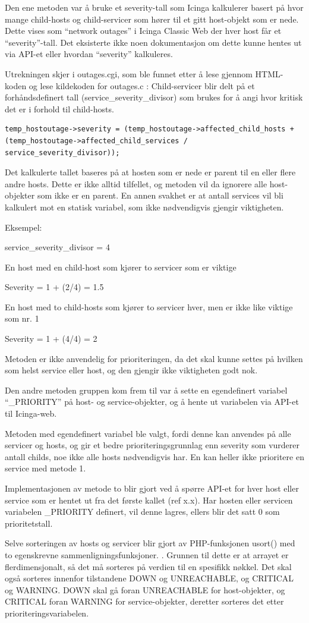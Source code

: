Den ene metoden var å bruke et severity-tall som Icinga kalkulerer basert på hvor mange child-hosts og child-servicer som hører til et gitt host-objekt som er nede. Dette vises som “network outages” i Icinga Classic Web der hver host får et “severity”-tall. Det eksisterte ikke noen dokumentasjon om dette kunne hentes ut via API-et eller hvordan “severity” kalkuleres. 

Utrekningen skjer i outages.cgi, som ble funnet etter å lese gjennom HTML-koden og lese kildekoden for outages.c \cite{dnsmichi} : 
Child-servicer blir delt på et forhåndsdefinert tall (service\_severity\_divisor) som brukes for å angi hvor kritisk det er i forhold til child-hosts.

\begin{lstlisting}
temp_hostoutage->severity = (temp_hostoutage->affected_child_hosts + (temp_hostoutage->affected_child_services / service_severity_divisor));
\end{lstlisting}

Det kalkulerte tallet baseres på at hosten som er nede er parent til en eller flere andre hosts. Dette er ikke alltid tilfellet, og metoden vil da ignorere alle host-objekter som ikke er en parent. En annen svakhet er at antall services vil bli kalkulert mot en statisk variabel, som ikke nødvendigvis gjengir viktigheten.

Eksempel:

service\_severity\_divisor = 4 

En host med en child-host som kjører to servicer som er viktige

Severity = 1 + (2/4) = 1.5

En host med to child-hosts som kjører to servicer hver, men er ikke like viktige som nr. 1

Severity = 1 + (4/4) = 2

Metoden er ikke anvendelig for prioriteringen, da det skal kunne settes på hvilken som helst service eller host, og den gjengir ikke viktigheten godt nok.     

Den andre metoden gruppen kom frem til var å sette en egendefinert variabel “\_PRIORITY” på host- og service-objekter, og å hente ut variabelen via API-et til Icinga-web.

Metoden med egendefinert variabel ble valgt, fordi denne kan anvendes på alle servicer og hosts, og gir et bedre prioriteringsgrunnlag enn severity som vurderer antall childs, noe ikke alle hosts nødvendigvis har. En kan heller ikke prioritere en service med metode 1.

Implementasjonen av metode to blir gjort ved å spørre API-et for hver host eller service som er hentet ut fra det første kallet (ref x.x). Har hosten eller servicen variabelen \_PRIORITY definert, vil denne lagres, ellers blir det satt 0 som prioritetstall.

Selve sorteringen av hosts og servicer blir gjort av PHP-funksjonen usort() med to egenskrevne sammenligningsfunksjoner. \cite{usort}. Grunnen til dette er at arrayet er flerdimensjonalt, så det må sorteres på verdien til en spesifikk nøkkel. Det skal også sorteres innenfor tilstandene DOWN og UNREACHABLE, og CRITICAL og WARNING. DOWN skal gå foran UNREACHABLE for host-objekter, og CRITICAL foran WARNING for service-objekter, deretter sorteres det etter prioriteringsvariabelen.

